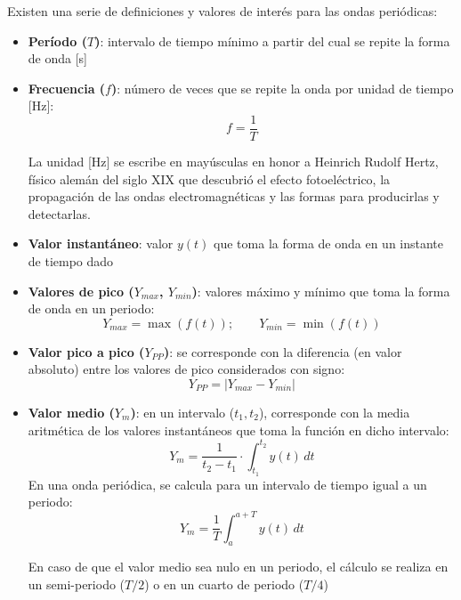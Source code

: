 	Existen una serie de definiciones y valores de interés para las ondas periódicas:
	\begin{itemize}
		\item \textbf{Período ($T$)}: intervalo de tiempo mínimo a partir del cual se repite la forma de onda [s]
		\item \textbf{Frecuencia ($f$)}: número de veces que se repite la onda por unidad de tiempo [Hz]:
		\begin{equation*}
			f = \dfrac{1}{T}
		\end{equation*}
		\begin{remark}
		    La unidad [Hz] se escribe en mayúsculas en honor a Heinrich Rudolf Hertz, físico alemán del siglo XIX que descubrió el efecto fotoeléctrico, la propagación de las ondas electromagnéticas y las formas para producirlas y detectarlas.
		\end{remark}
		\item \textbf{Valor instantáneo}: valor $y(t)$ que toma la forma de onda en un instante de tiempo dado
		\item \textbf{Valores de pico ($Y_{max}$, $Y_{min}$)}: valores máximo y mínimo que toma la forma de onda en un periodo:
		\begin{equation*}
			Y_{max} = \max(f(t)); \qquad Y_{min} = \min(f(t))
		\end{equation*}
		\item \textbf{Valor pico a pico ($Y_{PP}$)}: se corresponde con la diferencia (en valor absoluto) entre los valores de pico considerados con signo: 
		\begin{equation*}
			Y_{PP}=|Y_{max} - Y_{min}|
		\end{equation*}
		\item \textbf{Valor medio ($Y_m$)}: en un intervalo ($t_1,t_2$), corresponde con la media aritmética de los valores instantáneos que toma la función en dicho intervalo:
		\begin{equation*}
			Y_m=\dfrac{1}{t_2-t_1}\cdot\int_{t_1}^{t_2}y(t)\, dt
		\end{equation*}
		En una onda periódica, se calcula para un intervalo de tiempo igual a un periodo: 
		\begin{equation}\label{eq.valor_medio}
			\boxed{Y_m=\frac{1}{T}\int_{a}^{a+T}y(t)\, dt}
		\end{equation}
		\begin{remark}
			En caso de que el valor medio sea nulo en un periodo, el cálculo se realiza en un semi-periodo ($T/2$) o en un cuarto de periodo ($T/4$)
		\end{remark}

\end{itemize}
